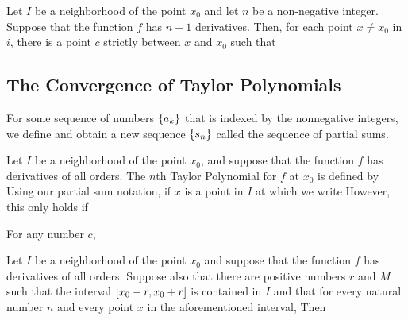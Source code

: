     \begin{thm}
        Let $I$ be a neighborhood of the point $x_0$ and let $n$ be a non-negative integer. Suppose that the function
        $f$ has $n+1$ derivatives. Then, for each point $x\neq x_0$ in $i$, there is a point $c$ strictly between $x$
        and $x_0$ such that
    \end{thm}

    \subsection{The Convergence of Taylor Polynomials}
    For some sequence of numbers ${\left\{ a_k \right\}}$ that is indexed by the nonnegative integers, we define
    and obtain a new sequence ${\left\{ s_n \right\}}$ called the sequence of partial sums.

    Let $I$ be a neighborhood of the point $x_0$, and suppose that the function $f$ has derivatives of all orders. The
    $n$th Taylor Polynomial for $f$ at $x_0$ is defined by
    Using our partial sum notation, if $x$ is a point in $I$ at which
    we write
    However, this only holds if

    \begin{thm}
        For any number $c$,
    \end{thm}

    \begin{thm}
        Let $I$ be a neighborhood of the point $x_0$ and suppose that the function $f$ has derivatives of all orders.
        Suppose also that there are positive numbers $r$ and $M$ such that the interval ${\left[ x_0 - r, x_0 + r \right]}$ is
        contained in $I$ and that for every natural number $n$ and every point $x$ in the aforementioned interval,
        Then
    \end{thm}

